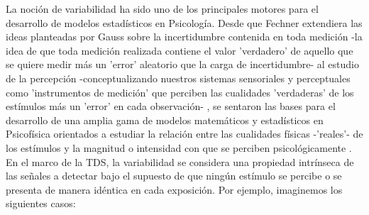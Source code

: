 La noción de variabilidad ha sido uno de los principales motores para el desarrollo de modelos estadísticos en Psicología. Desde que Fechner extendiera las ideas planteadas por Gauss sobre la incertidumbre contenida en toda medición -la idea de que toda medición realizada contiene el valor 'verdadero' de aquello que se quiere medir más un 'error' aleatorio que la carga de incertidumbre- al estudio de la percepción -conceptualizando nuestros sistemas sensoriales y perceptuales como 'instrumentos de medición' que perciben las cualidades 'verdaderas' de los estímulos más un 'error' en cada observación- \parencite{Fechner, Gauss}, se sentaron las bases para el desarrollo de una amplia gama de modelos matemáticos y estadísticos en Psicofísica orientados a estudiar la relación entre las cualidades físicas -'reales'- de los estímulos y la magnitud o intensidad con que se perciben psicológicamente \parencite{Link1994}.\\

En el marco de la TDS, la variabilidad se considera una propiedad intrínseca de las señales a detectar bajo el supuesto de que ningún estímulo se percibe o se presenta de manera idéntica en cada exposición. Por ejemplo, imaginemos los siguientes casos: \\

